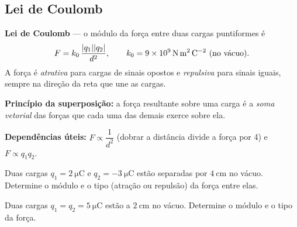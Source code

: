 
\subsection{Lei de Coulomb}

\begin{conceito}
\textbf{Lei de Coulomb} --- o módulo da força entre duas cargas puntiformes é
\[
F = k_{0}\,\frac{|q_1||q_2|}{d^2},\qquad
k_{0} = \SI{9e9}{\newton\meter\squared\per\coulomb\squared}\ \text{(no vácuo)}.
\]
A força é \emph{atrativa} para cargas de sinais opostos e \emph{repulsiva} para
sinais iguais, sempre na direção da reta que une as cargas.\par
\textbf{Princípio da superposição:} a força resultante sobre uma carga é a
\emph{soma vetorial} das forças que cada uma das demais exerce sobre ela.\par
\textbf{Dependências úteis:} $F \propto \dfrac{1}{d^2}$ (dobrar a distância divide
a força por 4) e $F \propto q_1 q_2$.
\end{conceito}

\legendaniveis

\blocofixacao

\begin{questao}[1]{}
Duas cargas $q_1 = \SI{+2}{\micro\coulomb}$ e $q_2 = \SI{-3}{\micro\coulomb}$
estão separadas por $\SI{4}{\centi\meter}$ no vácuo. Determine o módulo e o tipo
(atração ou repulsão) da força entre elas.
\end{questao}

\begin{questao}[1]{}
Duas cargas $q_1 = q_2 = \SI{+5}{\micro\coulomb}$ estão a
$\SI{2}{\centi\meter}$ no vácuo. Determine o módulo e o tipo da força.
\end{questao}

